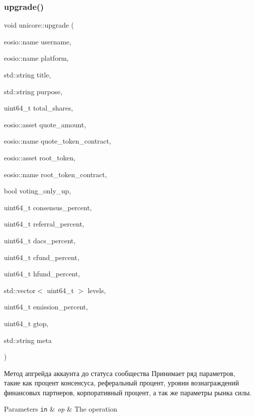\subsubsection{\texorpdfstring{upgrade()}{upgrade()}}
{\footnotesize\ttfamily void unicore\+::upgrade (\begin{DoxyParamCaption}\item[{eosio\+::name}]{username,  }\item[{eosio\+::name}]{platform,  }\item[{std\+::string}]{title,  }\item[{std\+::string}]{purpose,  }\item[{uint64\+\_\+t}]{total\+\_\+shares,  }\item[{eosio\+::asset}]{quote\+\_\+amount,  }\item[{eosio\+::name}]{quote\+\_\+token\+\_\+contract,  }\item[{eosio\+::asset}]{root\+\_\+token,  }\item[{eosio\+::name}]{root\+\_\+token\+\_\+contract,  }\item[{bool}]{voting\+\_\+only\+\_\+up,  }\item[{uint64\+\_\+t}]{consensus\+\_\+percent,  }\item[{uint64\+\_\+t}]{referral\+\_\+percent,  }\item[{uint64\+\_\+t}]{dacs\+\_\+percent,  }\item[{uint64\+\_\+t}]{cfund\+\_\+percent,  }\item[{uint64\+\_\+t}]{hfund\+\_\+percent,  }\item[{std\+::vector$<$ uint64\+\_\+t $>$}]{levels,  }\item[{uint64\+\_\+t}]{emission\+\_\+percent,  }\item[{uint64\+\_\+t}]{gtop,  }\item[{std\+::string}]{meta }\end{DoxyParamCaption})}



Метод апгрейда аккаунта до статуса сообщества Принимает ряд параметров, такие как процент консенсуса, реферальный процент, уровни вознаграждений финансовых партнеров, корпоративный процент, а так же параметры рынка силы. 


\begin{DoxyParams}[1]{Parameters}
\mbox{\tt in}  & {\em op} & The operation \\
\hline
\end{DoxyParams}
\mbox{\label{classunicore_a5a31fb29df7ae2b8cbf51625b5c2bc21}} 
